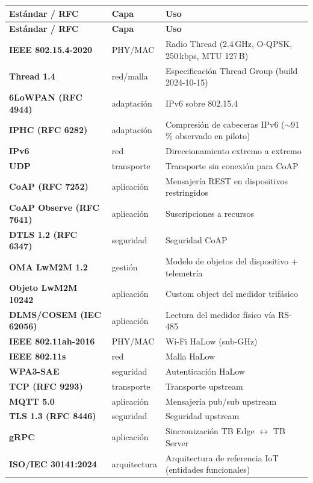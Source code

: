 \documentclass[11pt,a4paper]{article}
\newcommand{\tabhead}[1]{\textbf{\color{accentBlue!80!black}#1}}
\begin{document}
\noindent\begin{tabularx}{\linewidth}{L{4.4cm} L{2.6cm} Y}
\toprule
\tabhead{Estándar / RFC} & \tabhead{Capa} & \tabhead{Uso} \\
\midrule
\endfirsthead
\toprule
\tabhead{Estándar / RFC} & \tabhead{Capa} & \tabhead{Uso} \\
\midrule
\endhead
\textbf{IEEE 802.15.4-2020} & PHY/MAC & Radio Thread (2.4\,GHz, O-QPSK, 250\,kbps, MTU 127\,B) \\
\textbf{Thread 1.4} & red/malla & Especificación Thread Group (build 2024-10-15) \\
\textbf{6LoWPAN (RFC 4944)} & adaptación & IPv6 sobre 802.15.4 \\
\textbf{IPHC (RFC 6282)} & adaptación & Compresión de cabeceras IPv6 ($\sim$91\,\% observado en piloto) \\
\textbf{IPv6} & red & Direccionamiento extremo a extremo \\
\textbf{UDP} & transporte & Transporte sin conexión para CoAP \\
\textbf{CoAP (RFC 7252)} & aplicación & Mensajería REST en dispositivos restringidos \\
\textbf{CoAP Observe (RFC 7641)} & aplicación & Suscripciones a recursos \\
\textbf{DTLS 1.2 (RFC 6347)} & seguridad & Seguridad CoAP \\
\textbf{OMA LwM2M 1.2} & gestión & Modelo de objetos del dispositivo + telemetría \\
\textbf{Objeto LwM2M 10242} & aplicación & Custom object del medidor trifásico \\
\textbf{DLMS/COSEM (IEC 62056)} & aplicación & Lectura del medidor físico vía RS-485 \\
\textbf{IEEE 802.11ah-2016} & PHY/MAC & Wi-Fi HaLow (sub-GHz) \\
\textbf{IEEE 802.11s} & red & Malla HaLow \\
\textbf{WPA3-SAE} & seguridad & Autenticación HaLow \\
\textbf{TCP (RFC 9293)} & transporte & Transporte upstream \\
\textbf{MQTT 5.0} & aplicación & Mensajería pub/sub upstream \\
\textbf{TLS 1.3 (RFC 8446)} & seguridad & Seguridad upstream \\
\textbf{gRPC} & aplicación & Sincronización TB Edge $\leftrightarrow$ TB Server \\
\textbf{ISO/IEC 30141:2024} & arquitectura & Arquitectura de referencia IoT (entidades funcionales) \\
\bottomrule
\end{tabularx}
\end{document}
